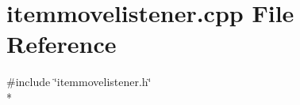 \section{itemmovelistener.\+cpp File Reference}
\label{items_2itemmovelistener_8cpp}
{\ttfamily \#include \char`\"{}itemmovelistener.\+h\char`\"{}}\\*
